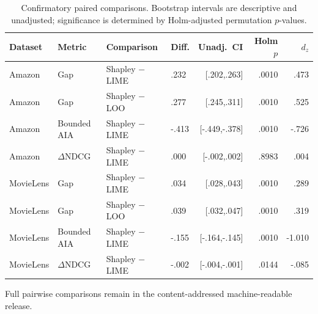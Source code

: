 \begin{table}[H]
\centering\scriptsize
\caption{Confirmatory paired comparisons. Bootstrap intervals are descriptive and unadjusted; significance is determined by Holm-adjusted permutation $p$-values.}
\label{tab:app-statistics}
\setlength{\tabcolsep}{2.5pt}
\begin{tabular}{@{}ll>{\raggedright\arraybackslash}p{}>{\raggedright\arraybackslash}p{}rrr@{}}
\toprule
Dataset & Metric & Comparison & Diff. & Unadj.\ CI & Holm $p$ & $d_z$ \\
\midrule
Amazon & Gap & Shapley $-$ LIME & .232 & [.202,.263] & .0010 & .473 \\
Amazon & Gap & Shapley $-$ LOO & .277 & [.245,.311] & .0010 & .525 \\
Amazon & Bounded AIA & Shapley $-$ LIME & -.413 & [-.449,-.378] & .0010 & -.726 \\
Amazon & $\Delta$NDCG & Shapley $-$ LIME & .000 & [-.002,.002] & .8983 & .004 \\
MovieLens & Gap & Shapley $-$ LIME & .034 & [.028,.043] & .0010 & .289 \\
MovieLens & Gap & Shapley $-$ LOO & .039 & [.032,.047] & .0010 & .319 \\
MovieLens & Bounded AIA & Shapley $-$ LIME & -.155 & [-.164,-.145] & .0010 & -1.010 \\
MovieLens & $\Delta$NDCG & Shapley $-$ LIME & -.002 & [-.004,-.001] & .0144 & -.085 \\
\bottomrule
\end{tabular}
\end{table}

\noindent Full pairwise comparisons remain in the content-addressed machine-readable release.

